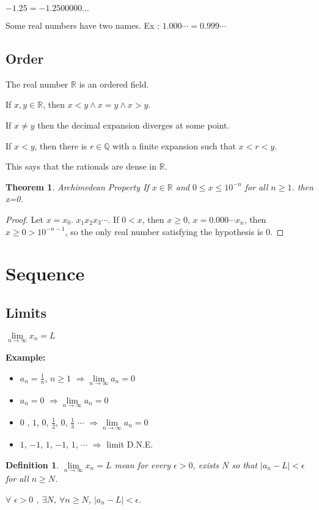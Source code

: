 \documentclass[12pt]{article}
\newcommand{\abs}[1]{\left| #1 \right|}
\theoremstyle{plain}
\newtheorem{theorem*}{Theorem}[subsection]
\newtheorem{definition}{Definition}[subsection]
\newcommand{\dlim}{\displaystyle\lim\limits}
\begin{document}
    $-1.25 = -1.2500000...$

    Some real numbers have two names. Ex : $1.000\cdots = 0.999\cdots$

    \vspace{0.5in}

    \subsection{Order}
    The real number $\mathbb{R}$ is an ordered field. 

    If $x, y \in \mathbb{R}$, then $x < y \land x=y \land x>y$. 
    
    If $x \neq y$ then the decimal expansion diverges at some point. 
    
    If $x < y$, then there is $r\in \mathbb{Q}$ with a finite expansion 
    such that $x < r< y$. 
    
    This says that the rationals are dense in $\mathbb{R}$. 

    \begin{theorem*}{Archimedean Property}
        If $x\in\mathbb{R}$ and $0\leq x \leq 10^{-n}$ 
        for all $n\geq 1$. then x=0.
    \end{theorem*}
    \begin{proof}
        Let $x = x_0. \,\, x_1 x_2 x_3\cdots$.
        If $0 < x$, then $x\geq 0$, $x = 0.000\cdots x_n$, 
        then $x \geq 0 > 10^{-n-1}$,
        so the only real number satisfying the hypothesis is 0.
    \end{proof}
    
    \newpage

\section{Sequence}
    \subsection{Limits}
    $\dlim_{n\to\infty} x_n = L$
    
    {\color{Brown}
    \textbf{Example:} 
    \begin{itemize}
        \item $a_n = \frac1n$, $n\geq 1$  
            $\Rightarrow \dlim_{n\to\infty} a_n = 0$
        \item $a_n = 0$ $\Rightarrow \dlim_{n\to\infty} a_n = 0$
        \item $0$ , $1$, $0$, $\frac12$, $0$, $\frac13$ $\cdots$
        $\Rightarrow \dlim_{n\to\infty} a_n = 0$
        \item $1$, $-1$, $1$, $-1$, $1$, $\cdots$ $\Rightarrow$ limit D.N.E.
    \end{itemize}}
    \bigskip
    \begin{definition}
        $\dlim_{n\to\infty} x_n=L$ mean for every $\epsilon >0$, 
        exists $N$ so that $\abs{a_n-L} < \epsilon$ for all $n\geq N$.

        $\forall\,\, \epsilon > 0$ , $\exists N$, 
        $\forall n\geq N$, $\abs{a_n-L} < \epsilon$.
    \end{definition}
\end{document}
